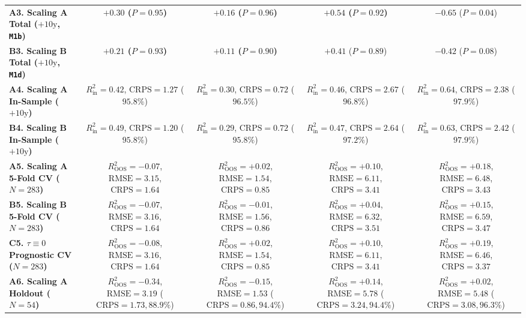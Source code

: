\documentclass[11pt,a4paper]{article}
\newcommand{\co}{\cellcolor{colodd}}
\newcommand{\ce}{\cellcolor{coleven}}
\begin{document}
\begin{table}[htbp]
{\begin{tabular}{l|c|c|c|c}
    \hline
    \rowcolor{rowodd}
    \textbf{A3. Scaling A Total ($+10\text{y}$, \texttt{M1b})} & \co \textbf{$+0.30$ ($P=0.95$)} & \textbf{$+0.16$ ($P=0.96$)} & \co \textbf{$+0.54$ ($P=0.92$)} & $-0.65$ ($P=0.04$) \\
    \rowcolor{roweven}
    \textbf{B3. Scaling B Total ($+10\text{y}$, \texttt{M1d})} & \ce \textbf{$+0.21$ ($P=0.93$)} & \textbf{$+0.11$ ($P=0.90$)} & \ce $+0.41$ ($P=0.89$) & $-0.42$ ($P=0.08$) \\
    \hline
    \rowcolor{rowodd}
    \textbf{A4. Scaling A In-Sample ($+10\text{y}$)} & \co $R^2_{\text{in}}=0.42$, $\text{CRPS}=1.27$ ($95.8\%$) & $R^2_{\text{in}}=0.30$, $\text{CRPS}=0.72$ ($96.5\%$) & \co $R^2_{\text{in}}=0.46$, $\text{CRPS}=2.67$ ($96.8\%$) & $R^2_{\text{in}}=0.64$, $\text{CRPS}=2.38$ ($97.9\%$) \\
    \rowcolor{roweven}
    \textbf{B4. Scaling B In-Sample ($+10\text{y}$)} & \ce $R^2_{\text{in}}=0.49$, $\text{CRPS}=1.20$ ($95.8\%$) & $R^2_{\text{in}}=0.29$, $\text{CRPS}=0.72$ ($95.8\%$) & \ce $R^2_{\text{in}}=0.47$, $\text{CRPS}=2.64$ ($97.2\%$) & $R^2_{\text{in}}=0.63$, $\text{CRPS}=2.42$ ($97.9\%$) \\
    \hline
    \rowcolor{rowodd}
    \textbf{A5. Scaling A 5-Fold CV ($N=283$)} & \co $R^2_{\text{OOS}}=-0.07$, $\text{RMSE}=3.15$, $\text{CRPS}=1.64$ & $R^2_{\text{OOS}}=+0.02$, $\text{RMSE}=1.54$, $\text{CRPS}=0.85$ & \co \textbf{$R^2_{\text{OOS}}=+0.10$}, $\text{RMSE}=6.11$, $\text{CRPS}=3.41$ & \textbf{$R^2_{\text{OOS}}=+0.18$}, $\text{RMSE}=6.48$, $\text{CRPS}=3.43$ \\
    \rowcolor{roweven}
    \textbf{B5. Scaling B 5-Fold CV ($N=283$)} & \ce $R^2_{\text{OOS}}=-0.07$, $\text{RMSE}=3.16$, $\text{CRPS}=1.64$ & $R^2_{\text{OOS}}=-0.01$, $\text{RMSE}=1.56$, $\text{CRPS}=0.86$ & \ce $R^2_{\text{OOS}}=+0.04$, $\text{RMSE}=6.32$, $\text{CRPS}=3.51$ & \textbf{$R^2_{\text{OOS}}=+0.15$}, $\text{RMSE}=6.59$, $\text{CRPS}=3.47$ \\
    \rowcolor{rowodd}
    \textbf{C5. $\tau \equiv 0$ Prognostic CV ($N=283$)} & \co $R^2_{\text{OOS}}=-0.08$, $\text{RMSE}=3.16$, $\text{CRPS}=1.64$ & $R^2_{\text{OOS}}=+0.02$, $\text{RMSE}=1.54$, $\text{CRPS}=0.85$ & \co \textbf{$R^2_{\text{OOS}}=+0.10$}, $\text{RMSE}=6.11$, $\text{CRPS}=3.41$ & \textbf{$R^2_{\text{OOS}}=+0.19$}, $\text{RMSE}=6.46$, $\text{CRPS}=3.37$ \\
    \hline
    \rowcolor{roweven}
    \textbf{A6. Scaling A Holdout ($N=54$)} & \ce $R^2_{\text{OOS}}=-0.34$, $\text{RMSE}=3.19$ {\scriptsize ($\text{CRPS}=1.73, 88.9\%$)} & $R^2_{\text{OOS}}=-0.15$, $\text{RMSE}=1.53$ {\scriptsize ($\text{CRPS}=0.86, 94.4\%$)} & \ce \textbf{$R^2_{\text{OOS}}=+0.14$}, $\text{RMSE}=5.78$ {\scriptsize ($\text{CRPS}=3.24, 94.4\%$)} & $R^2_{\text{OOS}}=+0.02$, $\text{RMSE}=5.48$ {\scriptsize ($\text{CRPS}=3.08, 96.3\%$)} \\

\end{tabular}}
\end{table}
\end{document}

